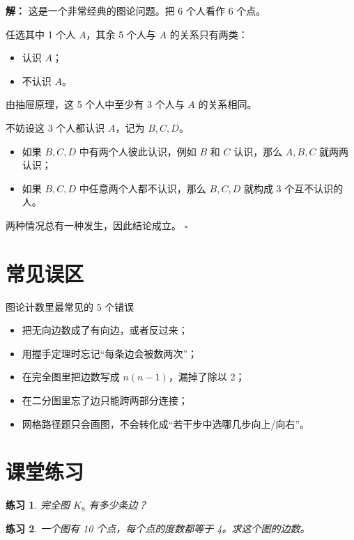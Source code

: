 \documentclass[11pt,a4paper,fontset=fandol]{ctexart}
\theoremstyle{formaltheorem}
\theoremstyle{formalexample}
\newtheorem{exercise}{练习}[section]
\newenvironment{solution}{\par\noindent\textbf{解：}}{\hfill$\square$\par}
\begin{document}
\begin{solution}
这是一个非常经典的图论问题。把 6 个人看作 6 个点。

任选其中 1 个人 $A$，其余 5 个人与 $A$ 的关系只有两类：
\begin{itemize}
  \item 认识 $A$；
  \item 不认识 $A$。
\end{itemize}

由抽屉原理，这 5 个人中至少有 3 个人与 $A$ 的关系相同。

不妨设这 3 个人都认识 $A$，记为 $B,C,D$。

\begin{itemize}
  \item 如果 $B,C,D$ 中有两个人彼此认识，例如 $B$ 和 $C$ 认识，那么 $A,B,C$ 就两两认识；
  \item 如果 $B,C,D$ 中任意两个人都不认识，那么 $B,C,D$ 就构成 3 个互不认识的人。
\end{itemize}

两种情况总有一种发生，因此结论成立。
\end{solution}

\section{常见误区}

\begin{notebox}{图论计数里最常见的 5 个错误}
\begin{itemize}
  \item 把无向边数成了有向边，或者反过来；
  \item 用握手定理时忘记“每条边会被数两次”；
  \item 在完全图里把边数写成 $n(n-1)$，漏掉了除以 2；
  \item 在二分图里忘了边只能跨两部分连接；
  \item 网格路径题只会画图，不会转化成“若干步中选哪几步向上/向右”。
\end{itemize}
\end{notebox}

\section{课堂练习}

\begin{exercise}
完全图 $K_8$ 有多少条边？
\end{exercise}

\begin{exercise}
一个图有 10 个点，每个点的度数都等于 4。求这个图的边数。
\end{exercise}
\end{document}
